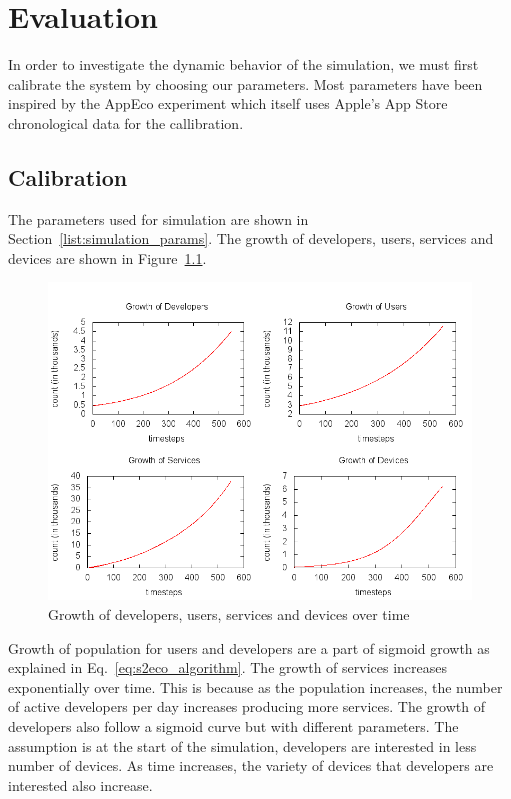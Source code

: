 \chapter{Evaluation}

In order to investigate the dynamic behavior of the simulation, we must first calibrate the system by choosing our parameters. Most parameters have been inspired by the AppEco experiment which itself uses Apple's App Store chronological data for the callibration.

\section{Calibration}

The parameters used for simulation are shown in Section~\ref{list:simulation_params}. The growth of developers, users, services and devices are shown in Figure~\ref{fig:growth_dev_user_services}.

\begin{figure}[!htb]
  \centering
  \includegraphics[width=14cm]{figures/dev_user_service_device.png}
  \caption{Growth of developers, users, services and devices over time}
  \label{fig:growth_dev_user_services}
\end{figure}

Growth of population for users and developers are a part of sigmoid growth as explained in Eq.~\ref{eq:s2eco_algorithm}. The growth of services increases exponentially over time. This is because as the population increases, the number of active developers per day increases producing more services. The growth of developers also follow a sigmoid curve but with different parameters. The assumption is at the start of the simulation, developers are interested in less number of devices. As time increases, the variety of devices that developers are interested also increase.

